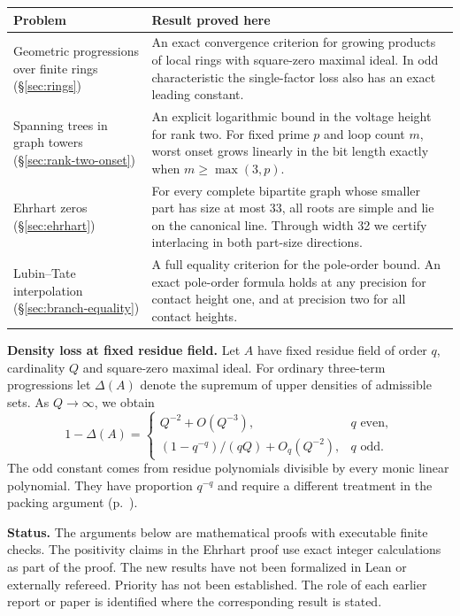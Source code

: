 \documentclass[11pt,letterpaper]{article}
\begin{document}
\medskip
\begin{center}\small
\begin{tabular}{@{}>{\raggedright\arraybackslash}p{.25\linewidth}>{\raggedright\arraybackslash}p{.68\linewidth}@{}}
\toprule
\textbf{Problem} & \textbf{Result proved here}\\ \midrule
Geometric progressions over finite rings (\S\ref{sec:rings}) &
An exact convergence criterion for growing products of local rings with square-zero maximal ideal. In odd characteristic the single-factor loss also has an exact leading constant.\\[4pt]
Spanning trees in graph towers (\S\ref{sec:rank-two-onset}) &
An explicit logarithmic bound in the voltage height for rank two. For fixed prime $p$ and loop count $m$, worst onset grows linearly in the bit length exactly when $m\ge\max(3,p)$.\\[4pt]
Ehrhart zeros (\S\ref{sec:ehrhart}) &
For every complete bipartite graph whose smaller part has size at most 33, all roots are simple and lie on the canonical line. Through width 32 we certify interlacing in both part-size directions.\\[4pt]
Lubin--Tate interpolation (\S\ref{sec:branch-equality}) &
A full equality criterion for the pole-order bound. An exact pole-order formula holds at any precision for contact height one, and at precision two for all contact heights.\\
\bottomrule
\end{tabular}
\end{center}
\medskip
\noindent\textbf{Density loss at fixed residue field.} Let $A$ have fixed residue field of order $q$, cardinality $Q$ and square-zero maximal ideal. For ordinary three-term progressions let $\Delta(A)$ denote the supremum of upper densities of admissible sets. As $Q\to\infty$, we obtain
\[
  1-\Delta(A)=
  \begin{cases}
      Q^{-2}+O(Q^{-3}),&q\text{ even},\\
      (1-q^{-q})/(qQ)+O_q(Q^{-2}),&q\text{ odd}.
  \end{cases}
\]
The odd constant comes from residue polynomials divisible by every monic linear polynomial. They have proportion $q^{-q}$ and require a different treatment in the packing argument (p.~\pageref{sec:odd-leading}).

\medskip
\noindent\textbf{Status.} The arguments below are mathematical proofs with executable finite checks. The positivity claims in the Ehrhart proof use exact integer calculations as part of the proof. The new results have not been formalized in Lean or externally refereed. Priority has not been established. The role of each earlier report or paper is identified where the corresponding result is stated.
\clearpage
\end{document}
